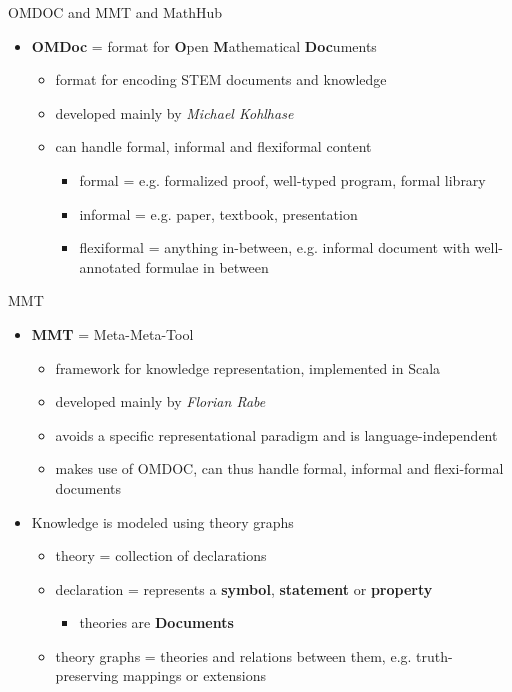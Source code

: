 \documentclass{beamer}
\begin{document}
    \begin{frame}{OMDOC and MMT and MathHub}
        \begin{itemize}
            \item \textbf{OMDoc} = format for \textbf{O}pen \textbf{M}athematical \textbf{Doc}uments
            \begin{itemize}
                \item format for encoding STEM documents and knowledge
                \item developed mainly by \textit{Michael Kohlhase}
                \item can handle formal, informal and flexiformal content
                \begin{itemize}
                    \item formal = e.g. formalized proof, well-typed program, formal library
                    \item informal = e.g. paper, textbook, presentation
                    \item flexiformal = anything in-between, e.g. informal document with well-annotated formulae in between
                \end{itemize}
            \end{itemize}
        \end{itemize}
    \end{frame}

    \begin{frame}[fragile]{MMT}
        \begin{itemize}
            \item \textbf{MMT} = Meta-Meta-Tool
            \begin{itemize}
                \item framework for knowledge representation, implemented in Scala
                \item developed mainly by \textit{Florian Rabe}
                \item avoids a specific representational paradigm and is language-independent
                \item makes use of OMDOC, can thus handle formal, informal and flexi-formal documents
            \end{itemize}
            \item Knowledge is modeled using theory graphs
            \begin{itemize}
                \item theory = collection of declarations 
                \item declaration = represents a \textbf{symbol}, \textbf{statement} or \textbf{property}
                \begin{itemize}
                    \item theories are \textbf{Documents}
                \end{itemize}
                \item theory graphs = theories and relations between them, e.g. truth-preserving mappings or extensions
            \end{itemize}
        \end{itemize}
        
    \end{frame}
\end{document}
